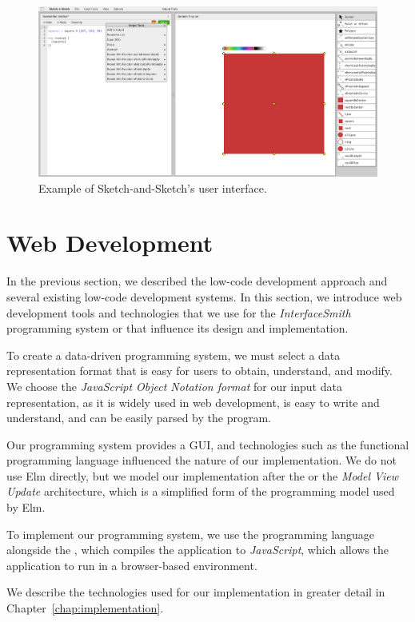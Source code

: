 \begin{figure}[htbp]
	\centering
	\includegraphics[width=1\linewidth]{img/sketch.pdf}
	\caption{Example of Sketch-and-Sketch's user interface. }
	\label{fig:sketch}
\end{figure}

\newpage
\section{Web Development}
In the previous section, we described the low-code development approach and several existing low-code development systems.
In this section, we introduce web development tools and technologies that we use for the \emph{InterfaceSmith} programming system or that influence its design and implementation.

To create a data-driven programming system, we must select a data representation format that is easy for users to obtain, understand, and modify.
We choose the \emph{JavaScript Object Notation format} for our input data representation, as it is widely used in web development, is easy to write and understand, and can be easily parsed by the program.

Our programming system provides a GUI, and technologies such as the \citet{eml} functional programming language influenced the nature of our implementation.
We do not use Elm directly, but we model our implementation after the \citet{elmish} or the \emph{Model View Update} architecture, which is a simplified form of the programming model used by Elm.

To implement our programming system, we use the \citet{fsharp} programming language alongside the \citet{fable}, which compiles the application to \emph{JavaScript}, which allows the application to run in a browser-based environment.

We describe the technologies used for our implementation in greater detail in Chapter~\ref{chap:implementation}.

